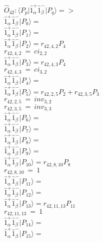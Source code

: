 \documentclass[14pt]{article}
\begin{document}
    $\hat{O}_{42}:  \langle{P_p}\vert \hat{1}_{\alpha}^{+}\hat{1}_{\beta}^{-} \vert{P_q}\rangle => $ \\ 
    $ \hat{1}_{\alpha}^{+}\hat{1}_{\beta}^{-} \vert{P_{0}}\rangle =  $ \\ 
    $ \hat{1}_{\alpha}^{+}\hat{1}_{\beta}^{-} \vert{P_{1}}\rangle =  $ \\ 
    $ \hat{1}_{\alpha}^{+}\hat{1}_{\beta}^{-} \vert{P_{2}}\rangle = {r}_{42,4,2}P_{4} $ \\ 
    ${r}_{42,4,2}\ =\ {ci}_{2,2} $ \\ 
    $ \hat{1}_{\alpha}^{+}\hat{1}_{\beta}^{-} \vert{P_{3}}\rangle = {r}_{42,4,3}P_{4} $ \\ 
    ${r}_{42,4,3}\ =\ {ci}_{3,2} $ \\ 
    $ \hat{1}_{\alpha}^{+}\hat{1}_{\beta}^{-} \vert{P_{4}}\rangle =  $ \\ 
    $ \hat{1}_{\alpha}^{+}\hat{1}_{\beta}^{-} \vert{P_{5}}\rangle = {r}_{42,2,5}P_{2}+{r}_{42,3,5}P_{3} $ \\ 
    ${r}_{42,2,5}\ =\ {inv}_{3,2} $ \\ 
    ${r}_{42,3,5}\ =\ {inv}_{3,3} $ \\ 
    $ \hat{1}_{\alpha}^{+}\hat{1}_{\beta}^{-} \vert{P_{6}}\rangle =  $ \\ 
    $ \hat{1}_{\alpha}^{+}\hat{1}_{\beta}^{-} \vert{P_{7}}\rangle =  $ \\ 
    $ \hat{1}_{\alpha}^{+}\hat{1}_{\beta}^{-} \vert{P_{8}}\rangle =  $ \\ 
    $ \hat{1}_{\alpha}^{+}\hat{1}_{\beta}^{-} \vert{P_{9}}\rangle =  $ \\ 
    $ \hat{1}_{\alpha}^{+}\hat{1}_{\beta}^{-} \vert{P_{10}}\rangle = {r}_{42,8,10}P_{8} $ \\ 
    ${r}_{42,8,10}\ =\ 1 $ \\ 
    $ \hat{1}_{\alpha}^{+}\hat{1}_{\beta}^{-} \vert{P_{11}}\rangle =  $ \\ 
    $ \hat{1}_{\alpha}^{+}\hat{1}_{\beta}^{-} \vert{P_{12}}\rangle =  $ \\ 
    $ \hat{1}_{\alpha}^{+}\hat{1}_{\beta}^{-} \vert{P_{13}}\rangle = {r}_{42,11,13}P_{11} $ \\ 
    ${r}_{42,11,13}\ =\ 1 $ \\ 
    $ \hat{1}_{\alpha}^{+}\hat{1}_{\beta}^{-} \vert{P_{14}}\rangle =  $ \\ 
    $ \hat{1}_{\alpha}^{+}\hat{1}_{\beta}^{-} \vert{P_{15}}\rangle =  $ \\ 
    
\end{document}
